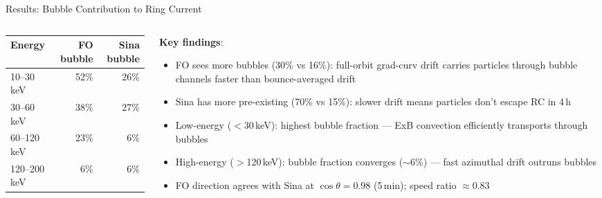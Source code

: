 \documentclass[aspectratio=169,11pt]{beamer}
\begin{document}
\begin{frame}{Results: Bubble Contribution to Ring Current}
\begin{columns}[T]
\begin{column}{0.48\textwidth}
\vspace{2pt}
\begin{tabular}{@{}lrr@{}}
\toprule
Energy & FO bubble & Sina bubble \\
\midrule
10--30\,keV & 52\% & 26\% \\
30--60\,keV & 38\% & 27\% \\
60--120\,keV & 23\% & 6\% \\
120--200\,keV & 6\% & 6\% \\
\bottomrule
\end{tabular}
\end{column}
\begin{column}{0.50\textwidth}
\footnotesize
\textbf{Key findings}:
\begin{itemize}\setlength\itemsep{2pt}
\item FO sees more bubbles (30\% vs 16\%): full-orbit grad-curv drift carries particles through bubble channels faster than bounce-averaged drift
\item Sina has more pre-existing (70\% vs 15\%): slower drift means particles don't escape RC in 4\,h
\item Low-energy ($<$30\,keV): highest bubble fraction --- ExB convection efficiently transports through bubbles
\item High-energy ($>$120\,keV): bubble fraction converges ($\sim$6\%) --- fast azimuthal drift outruns bubbles
\item FO direction agrees with Sina at $\cos\theta = 0.98$ (5\,min); speed ratio $\approx 0.83$
\end{itemize}
\end{column}
\end{columns}
\end{frame}
\end{document}

